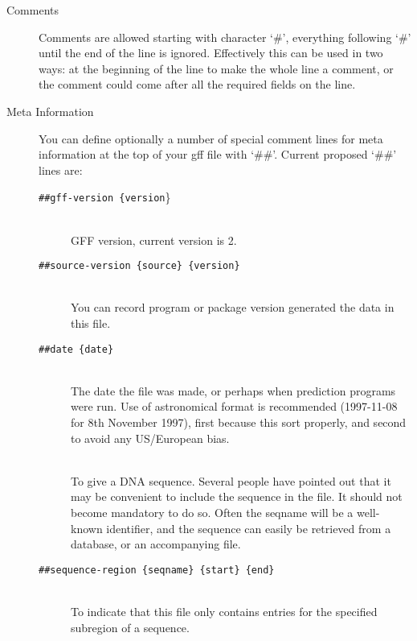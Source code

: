 \begin{description}
\item[Comments] Comments are allowed starting with character `\#', everything following `\#' until the end of the line is ignored. Effectively this can be used in two ways: at the beginning of the line to make the whole line a comment, or the comment could come after all the required fields on the line.  
\item[Meta Information] You can define optionally a number of special comment lines for meta information at the top of your gff file with `\#\#'. Current proposed `\#\#' lines are: 
\begin{description}
\item[\small\texttt{\#\#gff-version \{version}\}]\ \\GFF version, current version is 2.
\item[\small\texttt{\#\#source-version \{source\} \{version\}}]\ \\You can record program or package version generated the data in this file.
\item[\small\texttt{\#\#date \{date\}}]\ \\The date the file was made, or perhaps when prediction programs were run. Use of astronomical format is recommended (1997-11-08 for 8th November 1997), first because this sort properly, and second to avoid any US/European bias. 
\item[\parbox{0.5\linewidth}{\small\ttfamily\#\#DNA \{seqname\}\\\#\#acggctcggattggcgctggatgatagatcagacgac\\\#\#...\\\#\#end-DNA}]\ \\To give a DNA sequence. Several people have pointed out that it may be convenient to include the sequence in the file. It should not become mandatory to do so. Often the seqname will be a well-known identifier, and the sequence can easily be retrieved from a database, or an accompanying file. 
\item[\small\texttt{\#\#sequence-region \{seqname\} \{start\} \{end\}}]\ \\To indicate that this file only contains entries for the specified subregion of a sequence. 
\end{description}
\end{description}\vspace{-1ex}

